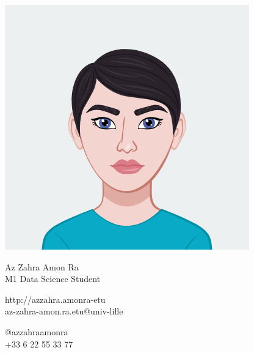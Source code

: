 \documentclass{article}
\begin{document}
\centering
\includegraphics[width=.25\linewidth]{new_logo}\\[5pt] %

\parbox{2in}{\Large \centering Az Zahra Amon Ra\\[1pt]
\normalsize M1 Data Science Student}

\vfill

\raggedright
\begin{multicols}{2}
http://azzahra.amonra-etu\\
az-zahra-amon.ra.etu@univ-lille

\columnbreak
\raggedleft
@azzahraamonra\\
+33 6 22 55 33 77%
\end{multicols}%
\end{document}
